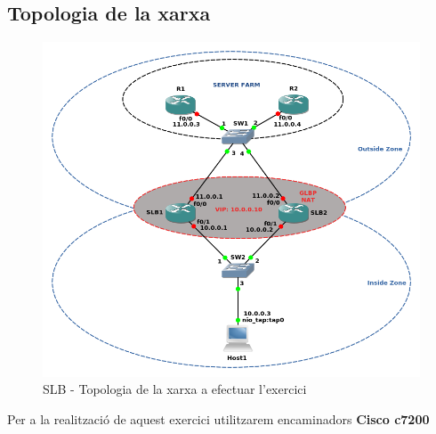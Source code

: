 \documentclass[10pt]{article}
\begin{document}
\subsection{Topologia de la xarxa}
\begin{figure}[H]
\begin{center}
\includegraphics[scale=0.6]{Images/topology1.png}
\caption{SLB - Topologia de la xarxa a efectuar l'exercici}
\end{center}
\end{figure}
Per a la realització de aquest exercici utilitzarem encaminadors \textbf{Cisco c7200}
\end{document}
